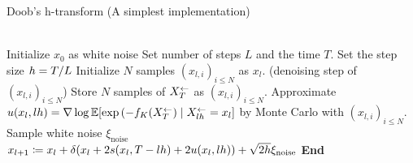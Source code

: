 \begin{algorithm}[htbp]
\caption{Doob's h-transform (A simplest implementation)}
\begin{algorithmic}\label{alg:doob-sampling}
    \\
    \STATE Initialize $x_0$ as white noise
    \STATE Set number of steps $L$ and the time $T$.
    \STATE Set the step size $h = T/L$
        \revisedStart
        \STATE Initialize $N$ samples $(x_{l,i})_{i\leq N}$ as $x_l$.
            \STATE (denoising step of $(x_{l,i})_{i\leq N}$)
        \ENDFOR
        \STATE Store $N$ samples of $X^\leftarrow_T$ as $(x_{l,i})_{i\leq N}$.
        \STATE Approximate $u(x_{l},lh) = \nabla \log \mathbb{E}[\exp{(-f_K(X^\leftarrow_T)} \mid X^\leftarrow_{lh}=x_{l}]$ by Monte Carlo with $(x_{l,i})_{i\leq N}$. %
        \revisedEnd
        \STATE Sample white noise $\xi_\mathrm{noise}$
        \STATE $x_{l+1} \coloneq x_{l} + \delta (x_{l} + 2 s(x_{l},T-lh) + 2 u(x_{l},lh)) + \sqrt{2h} \xi_\mathrm{noise}$
    \ENDFOR
    \STATE \textbf{End}
\end{algorithmic}
\end{algorithm}
\begin{comment}
======================= this part may not be needed =======================

In Doob's h-transform, $\nabla \log h_{l\delta}(x)$ is calculated as
\begin{align}
    &\nabla \log h_{l\delta}(x)\\
    =&\nabla \log \E_{\pmREF}[h_T(\Xref_T) \mid \Xref_{l\delta} = x]\\
    =& 
    \frac{
        \int
        \E_{\pmREF}[h_T(\Xref_T)\mid \Xref_{\tnext}=y]\frac{\partial}{\partial x}\mathcal{N}(\Xref_{\tnext}\mid m_{l\delta}(x), \sigma^2_{l\delta})\mathrm{d}y
    }{
        \int
        \E_{\pmREF}[h_T(\Xref_T)\mid \Xref_{\tnext}=y]\mathcal{N}(y \mid m_{l\delta}(x), \sigma^2_{l\delta})\mathrm{d}y
    }\label{eq:experiment-doob},
\end{align}
where $m_{l\delta}(x) = e^\delta x + (-2 s(x, T-\tprev))(1-e^\delta), \; \sigma^2_{l\delta} = e^{2\delta} - 1$, $\mathcal{N}(y\mid \mu,\sigma^2) \coloneq \frac{1}{\sqrt{2\pi\sigma^2}^d}\exp{\left(-\frac{\|y-\mu\|^2}{2\sigma^2}\right)}$.
The partial derivative $\frac{\partial}{\partial x}\mathcal{N}(y \mid m_{l\delta}(x), \sigma^2_{l\delta})$ is
\begin{equation}
    \frac{\left(\frac{\partial}{\partial x}m_{l\delta}(x)^\top \right) (m_{l\delta}(x) - y)}{\sigma_{l\delta}^2}\mathcal{N}(y \mid m_{l\delta}(x), \sigma^2_{l\delta}).
\end{equation}
Note that $\left(\frac{\partial}{\partial x}m_{l\delta}(x)^\top \right)$ is a $d \times d$ matrix and $\left(\frac{\partial}{\partial x}m_{l\delta}(x)^\top \right)_{ij} = \frac{\partial}{\partial \evx_i}m_{l\delta}(x)_j$.

=====================================================================
\end{comment}
